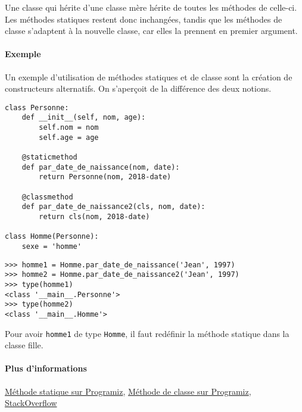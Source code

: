 Une classe qui hérite d'une classe mère hérite de toutes les méthodes de celle-ci. Les méthodes statiques restent donc inchangées, tandis que les méthodes de classe s'adaptent à la nouvelle classe, car elles la prennent en premier argument.

\paragraph{Exemple} Un exemple d'utilisation de méthodes statiques et de classe sont la création de constructeurs alternatifs. On s'aperçoit de la différence des deux notions.
\begin{verbatim}
class Personne:
    def __init__(self, nom, age):
        self.nom = nom
        self.age = age

    @staticmethod
    def par_date_de_naissance(nom, date):
        return Personne(nom, 2018-date)

    @classmethod
    def par_date_de_naissance2(cls, nom, date):
        return cls(nom, 2018-date)

class Homme(Personne):
    sexe = 'homme'
\end{verbatim}
\begin{verbatim}
>>> homme1 = Homme.par_date_de_naissance('Jean', 1997)
>>> homme2 = Homme.par_date_de_naissance2('Jean', 1997)
>>> type(homme1)
<class '__main__.Personne'>
>>> type(homme2)
<class '__main__.Homme'>
\end{verbatim}

Pour avoir \texttt{homme1} de type \texttt{Homme}, il faut redéfinir la méthode statique dans la classe fille.

\paragraph{Plus d'informations} \href{https://www.programiz.com/python-programming/methods/built-in/staticmethod}{Méthode statique sur Programiz}, \href{https://www.programiz.com/python-programming/methods/built-in/classmethod}{Méthode de classe sur Programiz}, \href{https://stackoverflow.com/questions/136097/what-is-the-difference-between-staticmethod-and-classmethod-in-python/1669524#1669524}{StackOverflow}
